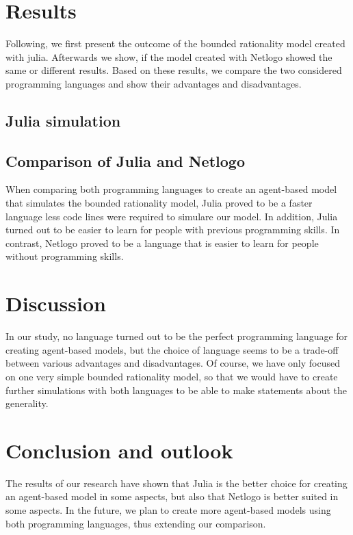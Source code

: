 \documentclass[runningheads]{llncs}
\begin{document}
\hypertarget{results}{%
\section{Results}\label{results}}

Following, we first present the outcome of the bounded rationality model
created with julia. Afterwards we show, if the model created with
Netlogo showed the same or different results. Based on these results, we
compare the two considered programming languages and show their
advantages and disadvantages.

\hypertarget{julia-simulation}{%
\subsection{Julia simulation}\label{julia-simulation}}

\hypertarget{comparison-of-julia-and-netlogo}{%
\subsection{Comparison of Julia and
Netlogo}\label{comparison-of-julia-and-netlogo}}

When comparing both programming languages to create an agent-based model
that simulates the bounded rationality model, Julia proved to be a
faster language less code lines were required to simulare our model. In
addition, Julia turned out to be easier to learn for people with
previous programming skills. In contrast, Netlogo proved to be a
language that is easier to learn for people without programming skills.

\hypertarget{discussion}{%
\section{Discussion}\label{discussion}}

In our study, no language turned out to be the perfect programming
language for creating agent-based models, but the choice of language
seems to be a trade-off between various advantages and disadvantages. Of
course, we have only focused on one very simple bounded rationality
model, so that we would have to create further simulations with both
languages to be able to make statements about the generality.

\hypertarget{conclusion-and-outlook}{%
\section{Conclusion and outlook}\label{conclusion-and-outlook}}

The results of our research have shown that Julia is the better choice
for creating an agent-based model in some aspects, but also that Netlogo
is better suited in some aspects. In the future, we plan to create more
agent-based models using both programming languages, thus extending our
comparison.


%
%
%
%
%
\printbibliography
\end{document}
